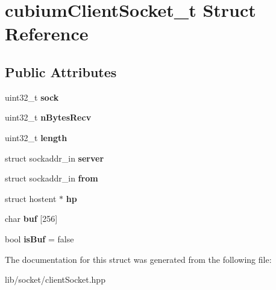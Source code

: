 \hypertarget{structcubiumClientSocket__t}{}\section{cubium\+Client\+Socket\+\_\+t Struct Reference}
\label{structcubiumClientSocket__t}
\subsection*{Public Attributes}
\begin{DoxyCompactItemize}
\item 
\mbox{\label{structcubiumClientSocket__t_abaa0344892988ffb56dea7f82b88cbc3}} 
uint32\+\_\+t {\bfseries sock}
\item 
\mbox{\label{structcubiumClientSocket__t_af0fb9d2f6a29407f9efb5cbc9da1f314}} 
uint32\+\_\+t {\bfseries n\+Bytes\+Recv}
\item 
\mbox{\label{structcubiumClientSocket__t_a1328962fd1aceb332accc664f006f35c}} 
uint32\+\_\+t {\bfseries length}
\item 
\mbox{\label{structcubiumClientSocket__t_ad89460d48cb94e5cda49ed0481e927f1}} 
struct sockaddr\+\_\+in {\bfseries server}
\item 
\mbox{\label{structcubiumClientSocket__t_adbcedcdc98e808414c6b08b41d3a3450}} 
struct sockaddr\+\_\+in {\bfseries from}
\item 
\mbox{\label{structcubiumClientSocket__t_a976b1153569e15360062775633f759fa}} 
struct hostent $\ast$ {\bfseries hp}
\item 
\mbox{\label{structcubiumClientSocket__t_af4af5909ff1caa85848438449d1edc91}} 
char {\bfseries buf} \mbox{[}256\mbox{]}
\item 
\mbox{\label{structcubiumClientSocket__t_aa796f9502f1416372e62080b9e1a7446}} 
bool {\bfseries is\+Buf} = false
\end{DoxyCompactItemize}


The documentation for this struct was generated from the following file\+:\begin{DoxyCompactItemize}
\item 
lib/socket/client\+Socket.\+hpp\end{DoxyCompactItemize}
